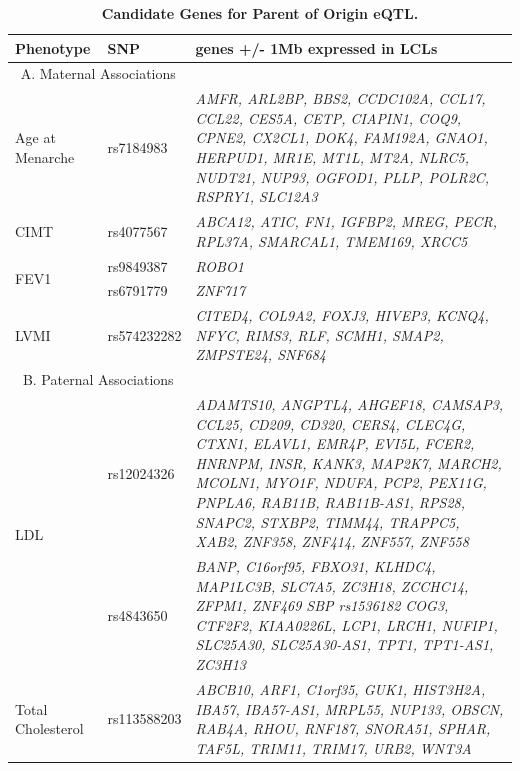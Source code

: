 \begin{table}
\centering
\begin{adjustbox}{width={\textwidth}}
\begin{tabular}{@{}p{5cm}|p{5cm}|p{10cm}@{}}
\toprule Phenotype & SNP & genes +/- 1Mb expressed in LCLs\\ \midrule

 \multicolumn{2}{c}{A. Maternal Associations} &\\ \hline
 
 Age at Menarche & rs7184983 & \emph{AMFR, ARL2BP, BBS2, CCDC102A, CCL17, CCL22, CES5A, CETP, CIAPIN1, COQ9, CPNE2, CX2CL1, DOK4, FAM192A, GNAO1, HERPUD1, MR1E, MT1L, MT2A, NLRC5, NUDT21, NUP93, OGFOD1, PLLP, POLR2C, RSPRY1, SLC12A3} \\ \hline
CIMT & rs4077567 & \emph{ABCA12, ATIC, FN1, IGFBP2, MREG, PECR, RPL37A, SMARCAL1, TMEM169, XRCC5} \\ \hline

\multirow{2}{5cm}{FEV1} & rs9849387 & \emph{ROBO1} \\ \cline{2-3}
 & rs6791779 & \emph{ZNF717} \\ \hline
LVMI	 & rs574232282 & \emph{CITED4, COL9A2, FOXJ3, HIVEP3, KCNQ4, NFYC, RIMS3, RLF, SCMH1, SMAP2, ZMPSTE24, SNF684} \\ \hline
\multicolumn{2}{c}{B. Paternal Associations} &\\  \hline
\multirow{2}{5cm}{LDL} & rs12024326 & \emph{ADAMTS10, ANGPTL4, AHGEF18, CAMSAP3, CCL25, CD209, CD320, CERS4, CLEC4G, CTXN1, ELAVL1, EMR4P, EVI5L, FCER2, HNRNPM, INSR, KANK3, MAP2K7, MARCH2, MCOLN1, MYO1F, NDUFA, PCP2, PEX11G, PNPLA6, RAB11B, RAB11B-AS1, RPS28, SNAPC2, STXBP2, TIMM44, TRAPPC5, XAB2, ZNF358, ZNF414, ZNF557, ZNF558} \\  \cline{2-3}

 & rs4843650 & \emph{BANP, C16orf95, FBXO31, KLHDC4, MAP1LC3B, SLC7A5, ZC3H18, ZCCHC14, ZFPM1, ZNF469
SBP	rs1536182	COG3, CTF2F2, KIAA0226L, LCP1, LRCH1, NUFIP1, SLC25A30, SLC25A30-AS1, TPT1, TPT1-AS1, ZC3H13}\\ \hline
Total Cholesterol & rs113588203 & \emph{ABCB10, ARF1, C1orf35, GUK1, HIST3H2A, IBA57, IBA57-AS1, MRPL55, NUP133, OBSCN, RAB4A, RHOU, RNF187, SNORA51, SPHAR, TAF5L, TRIM11, TRIM17, URB2, WNT3A} \\ \bottomrule
\end{tabular}
\end{adjustbox}
\caption[Candidate Genes for Parent of Origin eQTL. ]{\textbf{Candidate Genes for Parent of Origin eQTL.}}
\label{tab:tab-s3}
\end{table}




